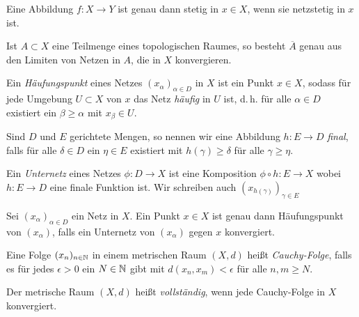 \documentclass{cheat-sheet}
\begin{document}
\begin{prop}
  Eine Abbildung $f : X \to Y$ ist genau dann stetig in $x \in X$, wenn sie netzstetig in $x$ ist.
\end{prop}

\begin{prop}
  Ist $A \subset X$ eine Teilmenge eines topologischen Raumes, so besteht $\overline{A}$ genau aus den Limiten von Netzen in $A$, die in $X$ konvergieren.
\end{prop}

\begin{defn}
  Ein \emph{Häufungspunkt} eines Netzes $(x_\alpha)_{\alpha \in D}$ in $X$ ist ein Punkt $x \in X$, sodass für jede Umgebung $U \subset X$ von $x$ das Netz \emph{häufig} in $U$ ist, d.\,h. für alle $\alpha \in D$ existiert ein $\beta \geq \alpha$ mit $x_\beta \in U$.
\end{defn}

\begin{defn}
  Sind $D$ und $E$ gerichtete Mengen, so nennen wir eine Abbildung $h : E \to D$ \emph{final}, falls für alle $\delta \in D$ ein $\eta \in E$ existiert mit $h(\gamma) \geq \delta$ für alle $\gamma \geq \eta$.
\end{defn}

\begin{defn}
  Ein \emph{Unternetz} eines Netzes $\phi : D \to X$ ist eine Komposition $\phi \circ h : E \to X$ wobei $h : E \to D$ eine finale Funktion ist. Wir schreiben auch $(x_{h(\gamma)})_{\gamma \in E}$
\end{defn}


\begin{prop}
  Sei $(x_\alpha)_{\alpha \in D}$ ein Netz in $X$. Ein Punkt $x \in X$ ist genau dann Häufungspunkt von $(x_\alpha)$, falls ein Unternetz von $(x_\alpha)$ gegen $x$ konvergiert.
\end{prop}

\begin{defn}
  Eine Folge $(x_n)_{n \in \mathbb{N}}$ in einem metrischen Raum $(X, d)$ heißt \emph{Cauchy-Folge}, falls es für jedes $\epsilon > 0$ ein $N \in \mathbb{N}$ gibt mit $d(x_n, x_m) < \epsilon$ für alle $n, m \geq N$.
\end{defn}

\begin{defn}
  Der metrische Raum $(X, d)$ heißt \emph{vollständig}, wenn jede Cauchy-Folge in $X$ konvergiert.
\end{defn}
\end{document}
